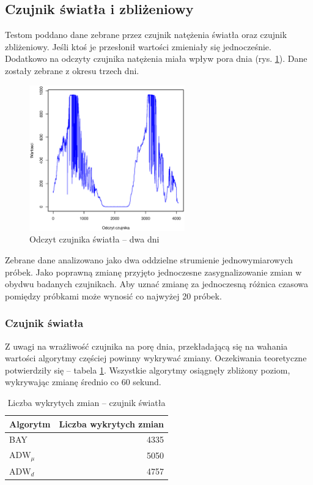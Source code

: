 \subsection{Czujnik światła i zbliżeniowy}
Testom poddano dane zebrane przez czujnik natężenia światła oraz czujnik zbliżeniowy.
Jeśli ktoś je przesłonił wartości zmieniały się jednocześnie.
Dodatkowo na odczyty czujnika natężenia miała wpływ pora dnia (rys. \ref{fig:DeviceLightRes}).
Dane zostały zebrane z okresu trzech dni.
\begin{figure}[htbp]
  \centering
  \includegraphics[width=0.6\textwidth]{img/ch-5-device-light}
  \caption{Odczyt czujnika światła -- dwa dni}
  \label{fig:DeviceLightRes}
\end{figure}

Zebrane dane analizowano jako dwa oddzielne strumienie jednowymiarowych próbek.
Jako poprawną zmianę przyjęto jednoczesne zasygnalizowanie zmian w obydwu badanych czujnikach.
Aby uznać zmianę za jednoczesną różnica czasowa pomiędzy próbkami może wynosić co najwyżej 20 próbek.

\subsubsection*{Czujnik światła}
Z uwagi na wrażliwość czujnika na porę dnia,
przekładającą się na wahania wartości algorytmy częściej powinny wykrywać zmiany.
Oczekiwania teoretyczne potwierdziły się -- tabela \ref{tab:LightResutl}.
Wszystkie algorytmy osiągnęły zbliżony poziom, wykrywając zmianę średnio co 60 sekund.
\begin{table}[h]
  \label{tab:LightResutl}
  \centering
  \begin{tabular}{l r }
    Algorytm & \multicolumn{1}{l}{Liczba wykrytych zmian} \\
    \hline
    BAY & 4335  \\
    $\mbox{ADW}_{\mu}$ & 5050 \\
    $\mbox{ADW}_{d}$ & 4757  \\
  \end{tabular}
  \caption{Liczba wykrytych zmian -- czujnik światła}
\end{table}
\clearpage
